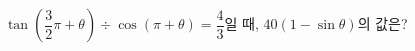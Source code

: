 $\tan\left(\dfrac{3}{2}\pi+\theta\right)\div\cos(\pi+\theta)=\dfrac{4}{3}$일 때, $40(1-\sin\theta)$의 값은?
